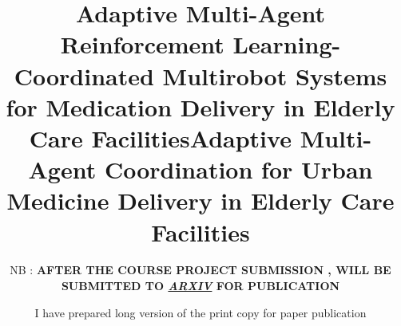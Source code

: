 \documentclass[conference]{IEEEtran}
\begin{document}
\title{Adaptive Multi-Agent Reinforcement Learning-Coordinated Multirobot Systems for Medication Delivery in Elderly Care Facilities}


\author{
\title{Adaptive Multi-Agent Coordination for Urban Medicine Delivery in Elderly Care Facilities}
\author{


NB : \textbf{AFTER THE COURSE PROJECT SUBMISSION , WILL BE SUBMITTED TO \textit{\href{https://arxiv.org/login?next_page=/user/}{ARXIV}} FOR PUBLICATION}
}
I have prepared  long version of the print copy for paper publication 
}

\maketitle    
\end{document}
